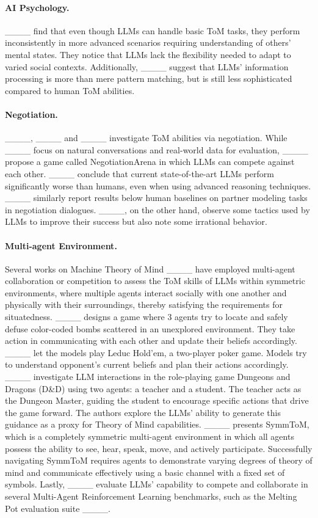 \paragraph{AI Psychology.} ____ find that even though LLMs can handle basic ToM tasks, they perform inconsistently in more advanced scenarios requiring understanding of others' mental states. They notice that LLMs lack the flexibility needed to adapt to varied social contexts. Additionally, ____ suggest that LLMs' information processing is more than mere pattern matching, but is still less sophisticated compared to human ToM abilities.

\paragraph{Negotiation.} ____, ____ and ____ investigate ToM abilities via negotiation. While ____ focus on natural conversations and real-world data for evaluation, ____ propose a game called NegotiationArena in which LLMs can compete against each other. ____ conclude that current state-of-the-art LLMs perform significantly worse than humans, even when using advanced reasoning techniques. ____ similarly report results below human baselines on partner modeling tasks in negotiation dialogues. ____, on the other hand, observe some tactics used by LLMs to improve their success but also note some irrational behavior.

\paragraph{Multi-agent Environment.} Several works on Machine Theory of Mind ____ have employed multi-agent collaboration or competition to assess the ToM skills of LLMs within symmetric environments, where multiple agents interact socially with one another and physically with their surroundings, thereby satisfying the requirements for situatedness. ____ designs a game where 3 agents try to locate and safely defuse color-coded bombs scattered in an unexplored environment. They take action in communicating with each other and update their beliefs accordingly. ____ let the models play Leduc Hold’em, a two-player poker game. Models try to understand opponent's current beliefs and plan their actions accordingly. ____ investigate LLM interactions in the role-playing game Dungeons and Dragons (D\&D) using two agents: a teacher and a student. The teacher acts as the Dungeon Master, guiding the student to encourage specific actions that drive the game forward. The authors explore the LLMs' ability to generate this guidance as a proxy for Theory of Mind capabilities. ____ presents SymmToM, which is a completely symmetric multi-agent environment in which all agents possess the ability to see, hear, speak, move, and actively participate. Successfully navigating SymmToM requires agents to demonstrate varying degrees of theory of mind and communicate effectively using a basic channel with a fixed set of symbols. Lastly, ____ evaluate LLMs' capability to compete and collaborate in several Multi-Agent Reinforcement Learning benchmarks, such as the Melting Pot evaluation suite ____.

